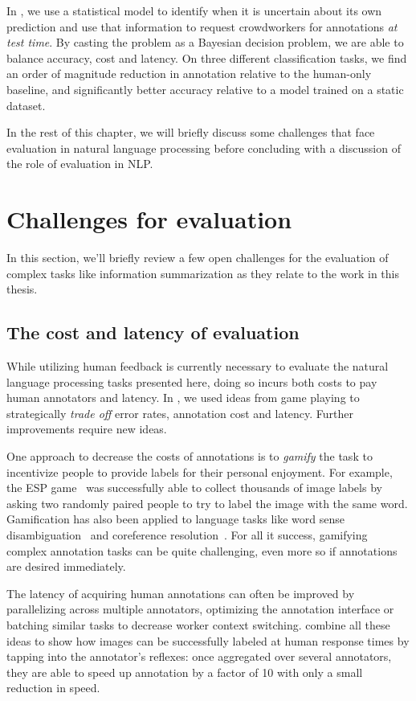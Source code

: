 In , we use a statistical model to identify when it is uncertain about its own prediction and use that information to request crowdworkers for annotations \textit{at test time}. 
By casting the problem as a Bayesian decision problem, we are able to balance accuracy, cost and latency.
On three different classification tasks, we find an order of magnitude reduction in annotation relative to the human-only baseline, and significantly better accuracy relative to a model trained on a static dataset.

In the rest of this chapter, we will briefly discuss some challenges that face evaluation in natural language processing before concluding with a discussion of the role of evaluation in NLP.\@

\section{Challenges for evaluation}
In this section, we'll briefly review a few open challenges for the evaluation of complex tasks like information summarization as they relate to the work in this thesis.

\subsection{The cost and latency of evaluation}
While utilizing human feedback is currently necessary to evaluate the natural language processing tasks presented here,
  doing so incurs both costs to pay human annotators and latency.
In , we used ideas from game playing to strategically \textit{trade off} error rates, annotation cost and latency. 
Further improvements require new ideas.

One approach to decrease the costs of annotations is to \textit{gamify} the task to incentivize people to provide labels for their personal enjoyment.
For example, the ESP game~\citep{ahn2004labeling} was successfully able to collect thousands of image labels by asking two randomly paired people to try to label the image with the same word.
Gamification has also been applied to language tasks like word sense disambiguation~\citep{vannella2014validating} and coreference resolution~\citep{poesio2013phrase}.
For all it success, gamifying complex annotation tasks can be quite challenging, even more so if annotations are desired immediately.

The latency of acquiring human annotations can often be improved by parallelizing across multiple annotators, optimizing the annotation interface  or batching similar tasks to decrease worker context switching.
\citet{krishna2016embracing} combine all these ideas to show how images can be successfully labeled at human response times by tapping into the annotator's reflexes: once aggregated over several annotators, they are able to speed up annotation by a factor of 10 with only a small reduction in speed.

